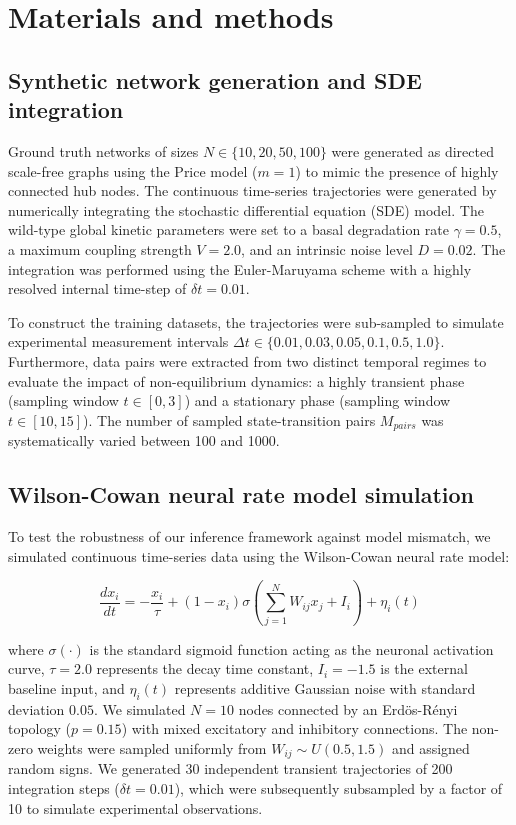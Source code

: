 \documentclass[10pt, aps, rmp,  twocolumn, superscriptaddress, floatfix, showkeys]{revtex4-2}
\begin{document}
\section{Materials and methods}

\subsection{Synthetic network generation and SDE integration}
Ground truth networks of sizes $N \in \{10, 20, 50, 100\}$ were generated as directed scale-free graphs using the Price model ($m=1$) to mimic the presence of highly connected hub nodes. The continuous time-series trajectories were generated by numerically integrating the stochastic differential equation (SDE) model. The wild-type global kinetic parameters were set to a basal degradation rate $\gamma = 0.5$, a maximum coupling strength $V = 2.0$, and an intrinsic noise level $D = 0.02$. The integration was performed using the Euler-Maruyama scheme with a highly resolved internal time-step of $\delta t = 0.01$.

To construct the training datasets, the trajectories were sub-sampled to simulate experimental measurement intervals $\Delta t \in \{0.01, 0.03, 0.05, 0.1, 0.5, 1.0\}$. Furthermore, data pairs were extracted from two distinct temporal regimes to evaluate the impact of non-equilibrium dynamics: a highly transient phase (sampling window $t \in [0, 3]$) and a stationary phase (sampling window $t \in [10, 15]$). The number of sampled state-transition pairs $M_{pairs}$ was systematically varied between 100 and 1000. 

\subsection{Wilson-Cowan neural rate model simulation}
To test the robustness of our inference framework against model mismatch, we simulated continuous time-series data using the Wilson-Cowan neural rate model:

\begin{equation}
    \frac{dx_i}{dt} = -\frac{x_i}{\tau} + (1 - x_i)\sigma\left(\sum_{j=1}^{N} W_{ij} x_j + I_i\right) + \eta_i(t)
\end{equation}

where $\sigma(\cdot)$ is the standard sigmoid function acting as the neuronal activation curve, $\tau=2.0$ represents the decay time constant, $I_i=-1.5$ is the external baseline input, and $\eta_i(t)$ represents additive Gaussian noise with standard deviation $0.05$. We simulated $N=10$ nodes connected by an Erd\"os-R\'enyi topology ($p=0.15$) with mixed excitatory and inhibitory connections. The non-zero weights were sampled uniformly from $W_{ij} \sim U(0.5, 1.5)$ and assigned random signs. We generated 30 independent transient trajectories of 200 integration steps ($\delta t = 0.01$), which were subsequently subsampled by a factor of 10 to simulate experimental observations.
\end{document}
